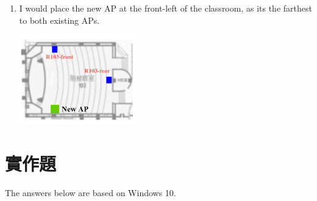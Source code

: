 \documentclass[12pt, a4paper]{article}
\begin{document}
\begin{enumerate}[label=(\alph*)]
    \item I would place the new AP at the front-left of the classroom, as its the
    farthest to both existing APs.

    \includegraphics[width=0.4\textwidth]{3-b_new_ap.png}
  \end{enumerate}

  \section{實作題}
  The answers below are based on Windows 10.
\end{document}
